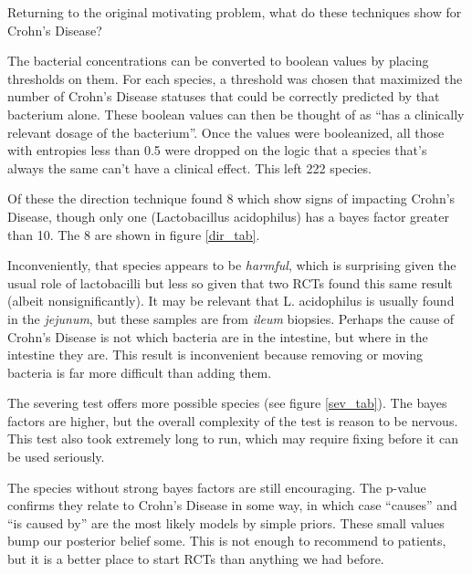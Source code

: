 \documentclass[twocolumn,12pt]{article}
\begin{document}
Returning to the original motivating problem, what do these techniques
show for Crohn's Disease?

The bacterial concentrations can be converted to boolean values by
placing thresholds on them.  For each species, a threshold was chosen that
maximized the number of Crohn's Disease statuses that could be
correctly predicted by that bacterium alone.  These boolean values can
then be thought of as ``has a clinically relevant dosage of the
bacterium''.  Once the values were booleanized, all those with
entropies less than 0.5 were dropped on the logic that a species
that's always the same can't have a clinical effect.  This left 222
species.

Of these the direction technique found 8 which show signs of impacting
Crohn's Disease, though only one (Lactobacillus acidophilus) has a
bayes factor greater than 10.  The 8 are shown in figure \ref{dir_tab}.

Inconveniently, that species appears to
be \textit{harmful}, which is surprising given the usual role of
lactobacilli but less so given that two RCTs found this same result
(albeit nonsignificantly)\cite{lgg1,lgg2}.  It may be relevant that
L. acidophilus is usually found in the
\textit{jejunum}\cite{lacid}, but these samples are from
\textit{ileum} biopsies.  Perhaps the cause of Crohn's Disease is not
which bacteria are in the intestine, but where in the intestine they
are.  This result is inconvenient because removing or moving bacteria
is far more difficult than adding them.

The severing test offers more possible species (see figure
\ref{sev_tab}).  The bayes factors are higher, but the overall
complexity of the test is reason to be nervous.  This test also took
extremely long to run, which may require fixing before it can be used
seriously.

The species without strong bayes factors are still encouraging.  The
p-value confirms they relate to Crohn's Disease in some way, in which
case ``causes'' and ``is caused by'' are the most likely models by
simple priors.  These small values bump our posterior belief some.
This is not enough to recommend to patients, but it is a better place
to start RCTs than anything we had before.

\newpage
\end{document}
